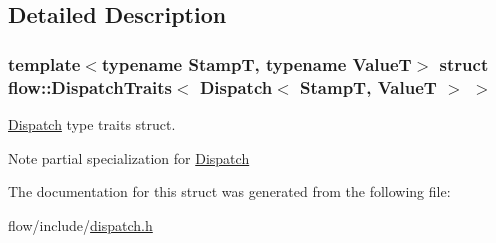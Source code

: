 \subsection{Detailed Description}
\subsubsection*{template$<$typename StampT, typename ValueT$>$\newline
struct flow\+::\+Dispatch\+Traits$<$ Dispatch$<$ Stamp\+T, Value\+T $>$ $>$}

\hyperlink{classflow_1_1_dispatch}{Dispatch} type traits struct. 

\begin{DoxyNote}{Note}
partial specialization for \hyperlink{classflow_1_1_dispatch}{Dispatch} 
\end{DoxyNote}


The documentation for this struct was generated from the following file\+:\begin{DoxyCompactItemize}
\item 
flow/include/\hyperlink{dispatch_8h}{dispatch.\+h}\end{DoxyCompactItemize}
